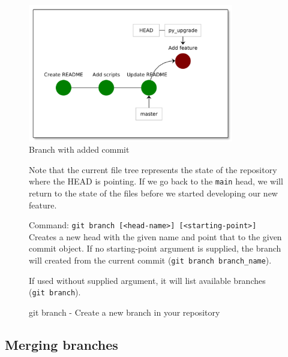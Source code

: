 \documentclass[../main/git_course_main.tex]{subfiles}
\begin{document}
	\begin{figure}[h!]
		\centering
		\includegraphics[width=0.8\textwidth]{../visualizations/chapter4/43_branch_with_commit.pdf}
		\caption{Branch with added commit}
		\label{fig:branch_commit}
	\end{figure}
	
	\begin{figure}[h!]
		\begin{redbox}
			Note that the current file tree represents the state of the repository where the HEAD is pointing. If we go back to the \verb$main$ head, we will return to the state of the files before we started developing our new feature.
		\end{redbox}
	\end{figure}
	
	\begin{figure}[h!]
		\begin{bluebox}
			Command: \verb$git branch [<head-name>] [<starting-point>]$ \\
			
			Creates a new head with the given name and point that to the given commit object.
			If no starting-point argument is supplied, the branch will created from the current commit (\verb$git branch branch_name$).
			
			If used without supplied argument, it will list available branches (\verb$git branch$).
		\end{bluebox}
		\label{command:branch}
		\caption{git branch - Create a new branch in your repository}
	\end{figure}
	
	\subsection{Merging branches}
	
\end{document}
